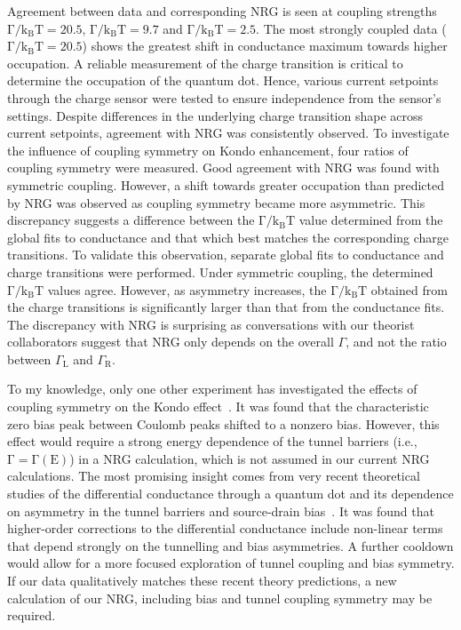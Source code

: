 Agreement between data and corresponding NRG is seen at coupling strengths $\mathrm{\Gamma/k_BT} = 20.5$, $\mathrm{\Gamma/k_BT} = 9.7$ and $\mathrm{\Gamma/k_BT} = 2.5$. The most strongly coupled data ($\mathrm{\Gamma/k_BT} = 20.5$) shows the greatest shift in conductance maximum towards higher occupation. 
A reliable measurement of the charge transition is critical to determine the occupation of the quantum dot. 
Hence, various current setpoints through the charge sensor were tested to ensure independence from the sensor's settings.
Despite differences in the underlying charge transition shape across current setpoints, agreement with NRG was consistently observed.
To investigate the influence of coupling symmetry on Kondo enhancement, four ratios of coupling symmetry were measured.
Good agreement with NRG was found with symmetric coupling. 
However, a shift towards greater occupation than predicted by NRG was observed as coupling symmetry became more asymmetric.
This discrepancy suggests a difference between the $\mathrm{\Gamma/k_BT}$ value determined from the global fits to conductance and that which best matches the corresponding charge transitions. 
To validate this observation, separate global fits to conductance and charge transitions were performed. Under symmetric coupling, the determined $\mathrm{\Gamma/k_BT}$ values agree. However, as asymmetry increases, the $\mathrm{\Gamma/k_BT}$ obtained from the charge transitions is significantly larger than that from the conductance fits.
The discrepancy with NRG is surprising as conversations with our theorist collaborators suggest that NRG only depends on the overall $\Gamma$, and not the ratio between $\Gamma_\mathrm{L}$ and $\Gamma_\mathrm{R}$.

To my knowledge, only one other experiment has investigated the effects of coupling symmetry on the Kondo effect~\cite{kondo_asymmetric}. 
It was found that the characteristic zero bias peak between Coulomb peaks shifted to a nonzero bias. However, this effect would require a strong energy dependence of the tunnel barriers (i.e., $\mathrm{\Gamma = \Gamma(E)}$) in a NRG calculation, which is not assumed in our current NRG calculations.
 The most promising insight comes from very recent theoretical studies of the differential conductance through a quantum dot and its dependence on asymmetry in the tunnel barriers and source-drain bias~\cite{Tsutsumi2021,kondo_nrg_asymmetric}. 
 It was found that higher-order corrections to the differential conductance include non-linear terms that depend strongly on the tunnelling and bias asymmetries. A further cooldown would allow for a more focused exploration of tunnel coupling and bias symmetry. If our data qualitatively matches these recent theory predictions, a new calculation of our NRG, including bias and tunnel coupling symmetry may be required. 



